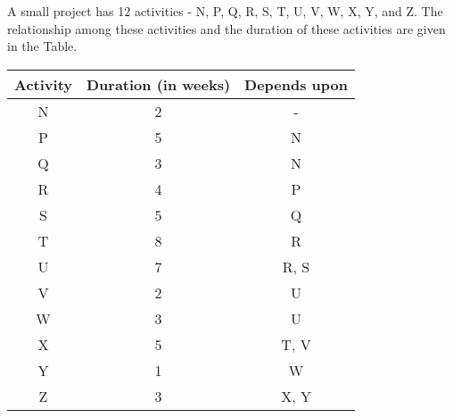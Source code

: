 \iffalse
    \title{Assignment}
    \author{EE24BTECH11063}
    \section{ce}
    \chapter{2012}
  \fi

    \item A small project has 12 activities - N, P, Q, R, S, T, U, V, W, X, Y, and Z. The relationship among these activities and the duration of these activities are given in the Table.

  

\begin{table}[!ht]    
  \centering
  \begin{tabular}{|c|c|c|}
\hline
\textbf{Activity} & \textbf{Duration (in weeks)} & \textbf{Depends upon} \\
\hline
N & 2 & - \\
P & 5 & N \\
Q & 3 & N \\
R & 4 & P \\
S & 5 & Q \\
T & 8 & R \\
U & 7 & R, S \\
V & 2 & U \\
W & 3 & U \\
X & 5 & T, V \\
Y & 1 & W \\
Z & 3 & X, Y \\
\hline
\end{tabular}
\end{table}

